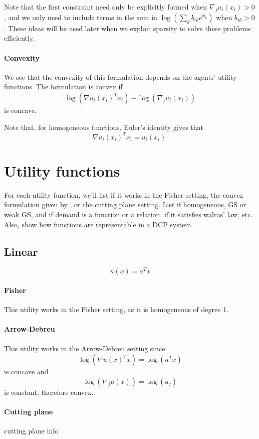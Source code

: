 \documentclass[12pt]{article}
\begin{document}
Note that the first constraint need only be explicitly formed when
$\nabla_j u_i(x_i) > 0$, and we only need to include terms in the sum in
$\log(\sum_k b_{ik} e^{\phi_k})$ when $b_{ik} > 0$.
These ideas will be used later when we exploit sparsity to solve these
problems efficiently.

\paragraph{Convexity}
We see that the convexity of this formulation depends on the agents'
utility functions.
The formulation is convex if
\[
\log(\nabla u_i(x_i)^T x_i) - \log(\nabla_j u_i(x_i))
\]
is concave.

Note that, for homogeneous functions, Euler's identity gives that
\[
\nabla u_i(x_i)^T x_i = u_i(x_i).
\]

\section{Utility functions}
For each utility function, we'll list if it works in the Fisher setting,
the convex formulation given by \cite{chen2010equilibrium},
or the cutting plane setting.
List if homogeneous, GS or weak GS, and if demand is a function or a relation.
if it satisfies walras' law, etc. Also, show how functions are representable
in a DCP system.

\subsection{Linear}
\[
u(x) = a^T x
\]
\paragraph{Fisher}
This utility works in the Fisher setting, as it is homogeneous of degree 1.
\paragraph{Arrow-Debreu}
This utility works in the Arrow-Debreu setting since
\[
\log(\nabla u(x)^T x) = \log(a^T x)
\]
is concave and
\[
\log(\nabla_j u(x)) = \log(a_j)
\]
is constant, therefore convex.

\paragraph{Cutting plane}
cutting plane info
\end{document}
